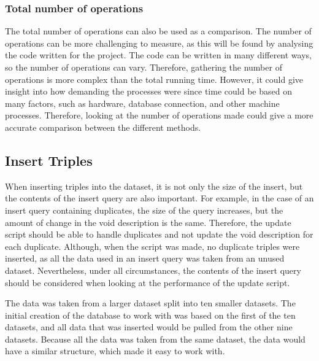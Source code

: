 \subsubsection{Total number of operations}
The total number of operations can also be used as a comparison.
The number of operations can be more challenging to measure, as this will be found by analysing the code written for the project. The code can be written in many different ways, so the number of operations can vary. Therefore, gathering the number of operations is more complex than the total running time. However, it could give insight into how demanding the processes were since time could be based on many factors, such as hardware, database connection, and other machine processes. Therefore, looking at the number of operations made could give a more accurate comparison between the different methods.


\subsection{Insert Triples}\label{sec:insert-triples}
When inserting triples into the dataset, it is not only the size of the insert, but the contents of the insert query are also important. For example, in the case of an insert query containing duplicates, the size of the query increases, but the amount of change in the \gls{void} description is the same. Therefore, the update script should be able to handle duplicates and not update the \gls{void} description for each duplicate. Although, when the script was made, no duplicate triples were inserted, as all the data used in an insert query was taken from an unused dataset. Nevertheless, under all circumstances, the contents of the insert query should be considered when looking at the performance of the update script.


The data was taken from a larger dataset split into ten smaller datasets. The initial creation of the database to work with was based on the first of the ten datasets, and all data that was inserted would be pulled from the other nine datasets. Because all the data was taken from the same dataset, the data would have a similar structure, which made it easy to work with.



